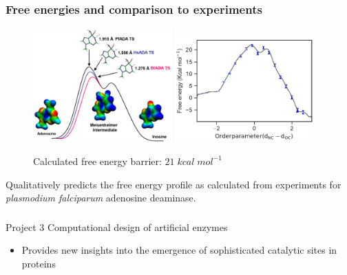 \documentclass{beamer}
\begin{document}
\begin{frame}
\frametitle{Free energies and comparison to experiments}
\begin{figure}
   \includegraphics[width=0.475\textwidth]{figures/ada-exp.png}
   \hfill
   \includegraphics[width=0.475\textwidth]{figures/ada-fenergy.pdf}
\caption{Calculated free energy barrier: $21\;kcal\;mol^{-1}$}
\end{figure}
Qualitatively predicts the free energy profile as calculated from experiments for \textit{plasmodium falciparum}
adenosine deaminase.
\end{frame}
\begin{frame}
\frametitle{}
\begin{block}{\centering Project 3}
\centering Computational design of artificial enzymes
\end{block}
\pause
\begin{itemize}[<+-|alert@+>]
        \item  Provides new insights into the emergence of sophisticated catalytic sites in proteins
    \end{itemize}
\end{frame}
\end{document}
